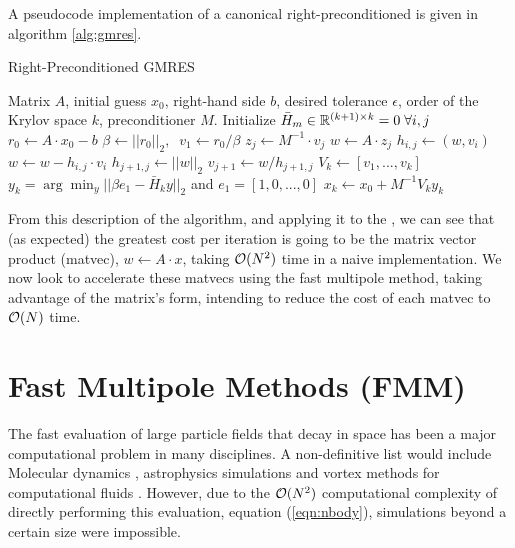 A pseudocode implementation of a canonical right-preconditioned {\gmres} \cite{SaadSchultz1986} is given in algorithm \ref{alg:gmres}.

\begin{algorithm}
	\caption{Right-Preconditioned GMRES \cite{SaadSchultz1986}}
	\label{alg:gmres}
	\begin{algorithmic}
		\Require Matrix $A$, initial guess $x_{0}$, right-hand side $b$, desired tolerance $\epsilon$, order of the Krylov space $k$, preconditioner $M$.
		\State Initialize $\bar{H}_{m} \in \mathbb{R}^{(k+1)\times k} = 0\;\forall i,j$
		\State $r_{0} \gets A\cdot x_{0}-b$
		\State $\beta \gets ||r_{0}||_{2},\;\; v_{1} \gets r_{0}/\beta$
			\State $z_{j} \gets M^{-1}\cdot v_{j}$
			\State $w \gets A\cdot z_{j}$
				\State $h_{i,j} \gets (w, v_{i})$
				\State $w \gets w - h_{i,j}\cdot v_{i}$
			\EndFor
			\State $h_{j+1,j} \gets ||w||_{2}$
			\State $v_{j+1} \gets w / h_{j+1,j}$
		\EndFor
		\State $V_{k} \gets [ v_{1}, ..., v_{k}]$
		\State $y_{k} = \arg\min_{y}||\beta e_{1} - \bar{H}_{k}y||_{2}$ and $e_{1} = [1,0,...,0]$
		\State $x_{k} \gets x_{0} + M^{-1}V_{k}y_{k}$ 
	\end{algorithmic}
\end{algorithm}

From this description of the {\gmres} algorithm, and applying it to the {\bem}, we can see that (as expected) the greatest cost per iteration is going to be the matrix vector product (matvec), $w\gets A\cdot x$, taking $\mathcal{O}(N^{2})$ time in a naive implementation. We now look to accelerate these matvecs using the fast multipole method, taking advantage of the {\bem} matrix's form, intending to reduce the cost of each matvec to $\mathcal{O}(N)$ time.


\section{Fast Multipole Methods (FMM)}\label{sec:fmm}

The fast evaluation of large particle fields that decay in space has been a major computational problem in many disciplines. A non-definitive list would include Molecular dynamics \cite{Plimpton1995}, astrophysics simulations \cite{BarnesHut1986} and vortex methods for computational fluids \cite{YokotaBarba2012b}. However, due to the $\mathcal{O}(N^{2})$ computational complexity of directly performing this evaluation, equation (\ref{eqn:nbody}), simulations beyond a certain size were impossible.

